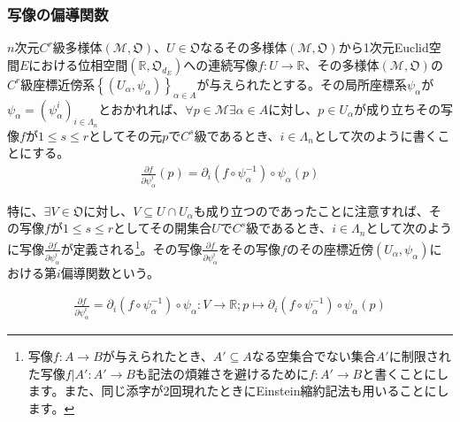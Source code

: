 \documentclass[dvipdfmx]{jsarticle}
\begin{document}
\subsubsection{写像の偏導関数}
\begin{dfn}
$n$次元$C^{r}$級多様体$\left( \mathcal{M},\mathfrak{O} \right)$、$U \in \mathfrak{O}$なるその多様体$\left( \mathcal{M},\mathfrak{O} \right)$から1次元Euclid空間$E$における位相空間$\left( \mathbb{R},\mathfrak{O}_{d_{E}} \right)$への連続写像$f:U \rightarrow \mathbb{R}$、その多様体$\left( \mathcal{M},\mathfrak{O} \right)$の$C^{r}$級座標近傍系$\left\{ \left( U_{\alpha},\psi_{\alpha} \right) \right\}_{\alpha \in A}$が与えられたとする。その局所座標系$\psi_\alpha $が$\psi_\alpha =\left( \psi_\alpha^i \right)_{i\in \varLambda_n }$とおかれれば、$\forall p\in \mathcal{M}\exists\alpha \in A$に対し、$p \in U_{\alpha}$が成り立ちその写像$f$が$1\leq s \leq r$としてその元$p$で$C^{s}$級であるとき、$i\in \varLambda_n $として次のように書くことにする。
\begin{align*}
\frac{\partial f}{\partial \psi_\alpha^i }(p) =\partial_i \left( f\circ \psi_\alpha^{-1} \right) \circ \psi_\alpha (p)
\end{align*}\par
特に、$\exists V \in \mathfrak{O}$に対し、$V \subseteq U \cap U_{\alpha}$も成り立つのであったことに注意すれば、その写像$f$が$1\leq s \leq r$としてその開集合$U$で$C^{s}$級であるとき、$i\in \varLambda_n $として次のように写像$\frac{\partial f}{\partial \psi_\alpha^i }$が定義される\footnote{写像$f:A\rightarrow B$が与えられたとき、$A'\subseteq A$なる空集合でない集合$A'$に制限された写像$f|A':A'\rightarrow B$も記法の煩雑さを避けるために$f:A'\rightarrow B$と書くことにします。また、同じ添字が2回現れたときにEinstein縮約記法も用いることにします。}。その写像$\frac{\partial f}{\partial \psi_\alpha^i } $をその写像$f$のその座標近傍$\left( U_{\alpha},\psi_{\alpha} \right) $における第$i$偏導関数という。
\begin{comment}
\begin{align*}
\frac{\partial f}{\partial \psi_\alpha^i } =\partial_i \left( f|V \circ \psi_\alpha^{-1} |V \left( \psi_\alpha |V \right)\right) \circ \psi_\alpha |V :V\rightarrow \mathbb{R} ;p\mapsto \partial_i \left( f\circ \psi_\alpha^{-1} \right) \circ \psi_\alpha (p)
\end{align*}
\end{comment}
\begin{align*}
\frac{\partial f}{\partial \psi_\alpha^i } =\partial_i \left( f\circ \psi_\alpha^{-1} \right) \circ \psi_\alpha :V\rightarrow \mathbb{R} ;p\mapsto \partial_i \left( f\circ \psi_\alpha^{-1} \right) \circ \psi_\alpha (p)
\end{align*}
\end{dfn}\par
\end{document}
